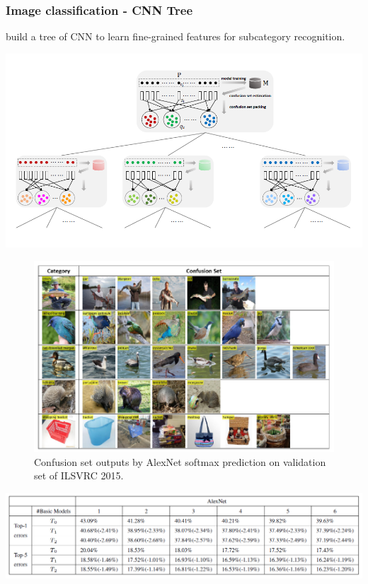 \begin{frame}[allowframebreaks]
\frametitle{Image classification - CNN Tree}

\cite{wang2018learning} build a tree of CNN to learn fine-grained features for subcategory recognition. 

\begin{center}
	\includegraphics[scale=0.8]{figs/CNNTree_scheme.png}
\end{center}

\framebreak

\begin{figure}
\begin{center}
	\includegraphics[scale=0.8]{figs/CNNTree_confusion_matrix_softmax}
\end{center}
\caption{Confusion set outputs by AlexNet softmax prediction on validation set of ILSVRC 2015.}
\end{figure}




\framebreak


\begin{center}
	\includegraphics[scale=0.7]{figs/CNNTree_result1.PNG}
\end{center}



\end{frame}
